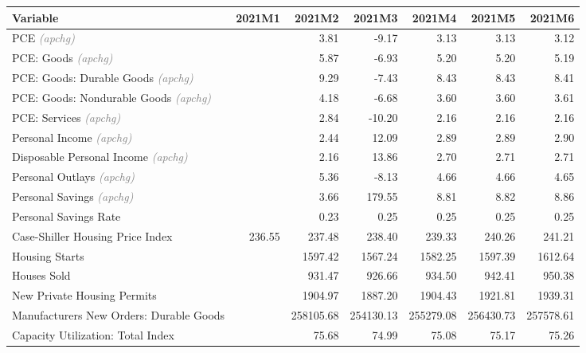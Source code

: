 \documentclass[11pt, letterpaper]{article}\usepackage[]{graphicx}\usepackage[]{color}
\begin{document}
\begin{table}[H]
\centering
\begingroup\fontsize{10pt}{12pt}\selectfont
\begin{tabular}{lrrrrrr}
  \hline
Variable & 2021M1 & 2021M2 & 2021M3 & 2021M4 & 2021M5 & 2021M6 \\ 
  \hline
PCE \textit{\footnotesize\textcolor{gray}{(apchg)}} &  & 3.81 & -9.17 & 3.13 & 3.13 & 3.12 \\ 
  PCE: Goods \textit{\footnotesize\textcolor{gray}{(apchg)}} &  & 5.87 & -6.93 & 5.20 & 5.20 & 5.19 \\ 
  PCE: Goods: Durable Goods \textit{\footnotesize\textcolor{gray}{(apchg)}} &  & 9.29 & -7.43 & 8.43 & 8.43 & 8.41 \\ 
  PCE: Goods: Nondurable Goods \textit{\footnotesize\textcolor{gray}{(apchg)}} &  & 4.18 & -6.68 & 3.60 & 3.60 & 3.61 \\ 
  PCE: Services \textit{\footnotesize\textcolor{gray}{(apchg)}} &  & 2.84 & -10.20 & 2.16 & 2.16 & 2.16 \\ 
  Personal Income \textit{\footnotesize\textcolor{gray}{(apchg)}} &  & 2.44 & 12.09 & 2.89 & 2.89 & 2.90 \\ 
  Disposable Personal Income \textit{\footnotesize\textcolor{gray}{(apchg)}} &  & 2.16 & 13.86 & 2.70 & 2.71 & 2.71 \\ 
  Personal Outlays \textit{\footnotesize\textcolor{gray}{(apchg)}} &  & 5.36 & -8.13 & 4.66 & 4.66 & 4.65 \\ 
  Personal Savings \textit{\footnotesize\textcolor{gray}{(apchg)}} &  & 3.66 & 179.55 & 8.81 & 8.82 & 8.86 \\ 
  Personal Savings Rate &  & 0.23 & 0.25 & 0.25 & 0.25 & 0.25 \\ 
  Case-Shiller Housing Price Index & 236.55 & 237.48 & 238.40 & 239.33 & 240.26 & 241.21 \\ 
  Housing Starts &  & 1597.42 & 1567.24 & 1582.25 & 1597.39 & 1612.64 \\ 
  Houses Sold &  & 931.47 & 926.66 & 934.50 & 942.41 & 950.38 \\ 
  New Private Housing Permits &  & 1904.97 & 1887.20 & 1904.43 & 1921.81 & 1939.31 \\ 
  Manufacturers New Orders: Durable Goods &  & 258105.68 & 254130.13 & 255279.08 & 256430.73 & 257578.61 \\ 
  Capacity Utilization: Total Index &  & 75.68 & 74.99 & 75.08 & 75.17 & 75.26 \\ 

\end{tabular}
\end{table}
\end{document}
